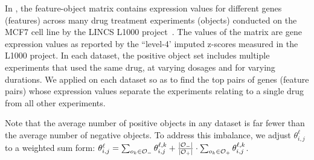 In \lincs, the feature-object matrix
contains expression values for different genes
(features) across many drug treatment experiments
(objects) conducted on the MCF7 cell line by the LINCS L1000 project~\cite{subramanian2017next}.
The values of the matrix are gene expression values as reported by the ``level-4' imputed z-scores measured in the L1000 project.
In each dataset, the positive object set includes
multiple experiments that used the same drug, at varying dosages and for varying durations. We applied \genviz on each dataset
so as to find the top pairs of genes (feature pairs)
whose expression values separate the \lincs experiments
relating to a single drug from all other \lincs experiments.


Note that the average number of positive objects
in any dataset is far fewer than the average number
of negative objects. To address this imbalance,
we adjust $\theta_{i,j}^{\ell}$ 
to a weighted sum form: $\theta_{i,j}^{\ell}= \sum_{o_k\in{\oo_-}}{\theta_{i,j}^{\ell,k}}+\frac{|\oo_-|}{|\oo_+|}\cdot\sum_{o_k\in{\oo_+}}{\theta_{i,j}^{\ell,k}}$.



